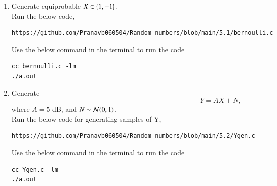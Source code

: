 \documentclass[journal,12pt,twocolumn]{IEEEtran}
\renewcommand\thesection{\arabic{section}}
\begin{document}
\begin{enumerate}[label=\thesection.\arabic*
,ref=\thesection.\theenumi]
\item Generate equiprobable $X \in \left\{1,-1\right\}$.\\
\solution
Run the below code,
\begin{lstlisting}
https://github.com/Pranavb060504/Random_numbers/blob/main/5.1/bernoulli.c
\end{lstlisting}
Use the below command in the terminal to run the code
\begin{lstlisting}
cc bernoulli.c -lm
./a.out
\end{lstlisting}
\item Generate 
\begin{equation}
Y = AX+N,
\end{equation}
		where $A = 5$ dB,  and $N \sim \mathcal{N}(0, 1)$.\\
\solution
Run the below code for generating samples of Y,
\begin{lstlisting}
https://github.com/Pranavb060504/Random_numbers/blob/main/5.2/Ygen.c
\end{lstlisting}
Use the below command in the terminal to run the code
\begin{lstlisting}
cc Ygen.c -lm
./a.out
\end{lstlisting}


\end{enumerate}
\end{document}
